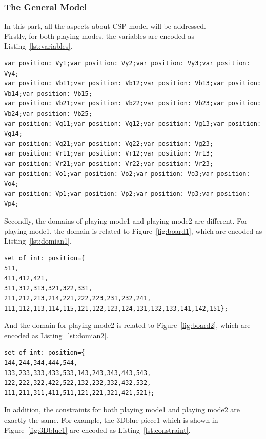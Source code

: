 \subsubsection{The General Model}
In this part, all the aspects about CSP model will be addressed.
\\Firstly, for both playing modes, the variables are encoded as Listing~\ref{lst:variables}.
\begin{lstlisting}[language=minizinc,numbers=none,caption={Encoding for variables},label={lst:variables}]
var position: Vy1;var position: Vy2;var position: Vy3;var position: Vy4;
var position: Vb11;var position: Vb12;var position: Vb13;var position: Vb14;var position: Vb15;
var position: Vb21;var position: Vb22;var position: Vb23;var position: Vb24;var position: Vb25;
var position: Vg11;var position: Vg12;var position: Vg13;var position: Vg14;
var position: Vg21;var position: Vg22;var position: Vg23;
var position: Vr11;var position: Vr12;var position: Vr13;
var position: Vr21;var position: Vr22;var position: Vr23;
var position: Vo1;var position: Vo2;var position: Vo3;var position: Vo4;
var position: Vp1;var position: Vp2;var position: Vp3;var position: Vp4;
\end{lstlisting}
\bigskip
\smallbreak
Secondly, the domains of playing mode1 and playing mode2 are different. For playing mode1, the domain is related to Figure~\ref{fig:board1}, which are encoded as Listing~\ref{lst:domian1}.
\begin{lstlisting}[language=minizinc,numbers=none,caption={Encoding for the domain of playing mode1},label={lst:domian1}]
set of int: position={
511,
411,412,421,
311,312,313,321,322,331,
211,212,213,214,221,222,223,231,232,241,
111,112,113,114,115,121,122,123,124,131,132,133,141,142,151};
\end{lstlisting}
\bigskip
\smallbreak
And the domain for playing mode2 is related to Figure~\ref{fig:board2}, which are encoded as Listing~\ref{lst:domian2}.
\begin{lstlisting}[language=minizinc,numbers=none,caption={Encoding for the domain of playing mode2},label={lst:domian2}]
set of int: position={
144,244,344,444,544,
133,233,333,433,533,143,243,343,443,543,
122,222,322,422,522,132,232,332,432,532,
111,211,311,411,511,121,221,321,421,521};
\end{lstlisting}
\bigskip
\smallbreak
In addition, the constraints for both playing mode1 and playing mode2 are exactly the same. For example, the 3Dblue piece1 which is shown in Figure~\ref{fig:3Dblue1} are encoded as Listing~\ref{lst:constraint}.
